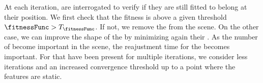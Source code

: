 
At each iteration,  are interrogated to verify if they are still fitted to belong at their position. We first check that the fitness is above a given threshold  $\fitnessFunc > T_{\fitnessFunc}$. If not, we remove the  from the scene. On the other case, we can improve the shape of the  by minimizing again their . As the number of  become important in the scene, the reajustment time for the  becomes important. For  that have been present for multiple iterations, we consider less iterations and an increased convergence threshold up to a point where the features are static.


